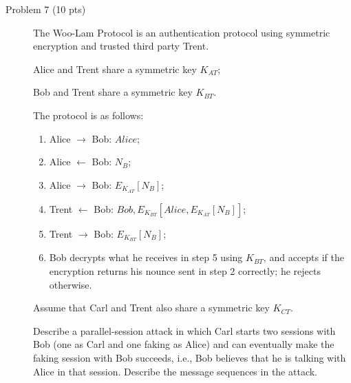 \documentclass[11pt]{article}
\begin{document}
\begin{description}
\item[Problem 7 (10 pts)]

The Woo-Lam Protocol is an authentication protocol using symmetric
encryption and trusted third party Trent.

Alice and Trent share a symmetric key $K_{AT}$;

Bob and Trent share a symmetric key $K_{BT}$.

The protocol is as follows:

\begin{enumerate}
 \item
Alice $\rightarrow$ Bob: $\mathit{Alice}$;

 \item
Alice $\leftarrow$ Bob: $N_B$;

 \item
Alice $\rightarrow$ Bob: $E_{K_{AT}}[N_B]$;

 \item
Trent $\leftarrow$ Bob:
$\mathit{Bob},E_{K_{BT}}[\mathit{Alice},E_{K_{AT}}[N_B]]$;

 \item
Trent $\rightarrow$ Bob: $E_{K_{BT}}[N_B]$;

 \item
Bob decrypts what he receives in step 5 using $K_{BT}$, and accepts if
the encryption returns his nounce sent in step 2 correctly; he rejects
otherwise.
\end{enumerate}

Assume that Carl and Trent also share a symmetric key $K_{CT}$.

Describe a parallel-session attack in which Carl starts two sessions
with Bob (one as Carl and one faking as Alice) and can eventually make
the faking session with Bob succeeds, i.e., Bob believes that he is
talking with Alice in that session.  Describe the message sequences in
the attack.


\end{description}
\end{document}
